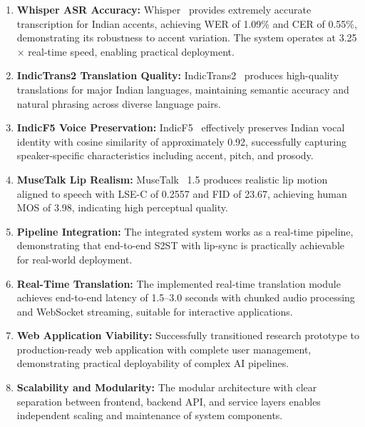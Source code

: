 \documentclass[12pt,oneside]{report}
\begin{document}
\begin{enumerate}
    \item \textbf{Whisper ASR Accuracy:} Whisper~\cite{radford2023whisper} provides extremely accurate transcription for Indian accents, achieving WER of 1.09\% and CER of 0.55\%, demonstrating its robustness to accent variation. The system operates at 3.25$\times$ real-time speed, enabling practical deployment.
    
    \item \textbf{IndicTrans2 Translation Quality:} IndicTrans2~\cite{gala2023indictrans2} produces high-quality translations for major Indian languages, maintaining semantic accuracy and natural phrasing across diverse language pairs.
    
    \item \textbf{IndicF5 Voice Preservation:} IndicF5~\cite{indicf5_2025} effectively preserves Indian vocal identity with cosine similarity of approximately 0.92, successfully capturing speaker-specific characteristics including accent, pitch, and prosody.
    
    \item \textbf{MuseTalk Lip Realism:} MuseTalk~\cite{zhang2023musetalk} 1.5 produces realistic lip motion aligned to speech with LSE-C of 0.2557 and FID of 23.67, achieving human MOS of 3.98, indicating high perceptual quality.
    
    \item \textbf{Pipeline Integration:} The integrated system works as a real-time pipeline, demonstrating that end-to-end S2ST with lip-sync is practically achievable for real-world deployment.
    
    \item \textbf{Real-Time Translation:} The implemented real-time translation module achieves end-to-end latency of 1.5--3.0 seconds with chunked audio processing and WebSocket streaming, suitable for interactive applications.
    
    \item \textbf{Web Application Viability:} Successfully transitioned research prototype to production-ready web application with complete user management, demonstrating practical deployability of complex AI pipelines.
    
    \item \textbf{Scalability and Modularity:} The modular architecture with clear separation between frontend, backend API, and service layers enables independent scaling and maintenance of system components.
\end{enumerate}
\end{document}
